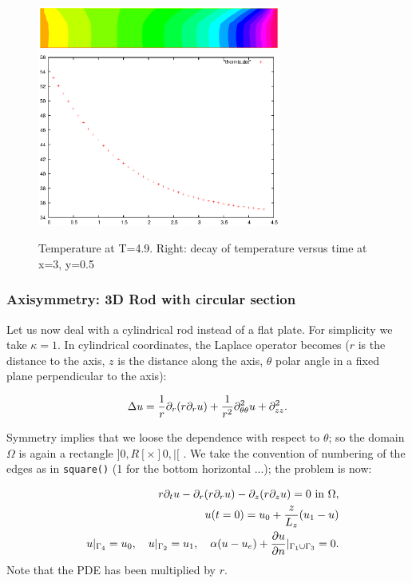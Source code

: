 \documentclass[a4paper,twoside,12pt]{book}
\def\p{\partial}
\begin{document}
\begin{figure}[htbp]
\begin{center}
\includegraphics[width=8cm]{thermic}~~~
\includegraphics[width=8cm]{thermicvst}

\caption{\label{figthermic} Temperature at T=4.9. Right: decay of temperature versus time at x=3, y=0.5}
\end{center}
\end{figure}

\subsubsection{Axisymmetry: 3D Rod with circular section}

Let us now deal with a cylindrical rod instead of a flat plate.  For simplicity we take $\kappa=1$.
In cylindrical coordinates, the Laplace
operator becomes ($r$ is the distance to the axis, $z$ is the distance along the
axis, $\theta$ polar angle in a fixed plane perpendicular to the axis):

$$ \Delta u = {1\over r}\p _r(r\p _r u) + {1\over r^2}\p ^2_{\theta\theta} u
 + \p ^2_{z z}.
$$

Symmetry implies that we loose the dependence with respect to
$\theta$; so the domain $\Omega$ is again a rectangle $]0,R[\times]0,|[$ . We take the convention of
numbering of the edges as in {\tt square()} (1 for the bottom horizontal ...);
the problem is now:

\begin{eqnarray}&&
r\p_t u-\p _r(r\p _r u) - \p _z(r\p _z u) = 0 \hbox{ in } \Omega,
\cr&&
u(t=0) = u_0 + \frac z{L_z} (u_1-u)
\cr&&
u|_{\Gamma_4} = u_0,\quad  u|_{\Gamma_2} = u_1,
\quad \alpha(u-u_e) + {\p u\over \p n} |_{\Gamma_1\cup\Gamma_3} = 0.
\end{eqnarray}
Note that the PDE has been multiplied by $r$.
\end{document}
